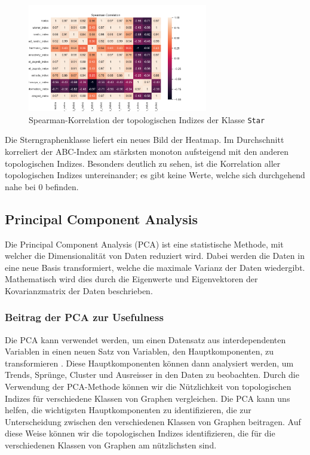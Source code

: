 \begin{figure}[H]
    \centering
    \includegraphics[width=0.7\textwidth]{images/30_results/star-correlation.png}
    \caption{Spearman-Korrelation der topologischen Indizes der Klasse \texttt{Star}}
    \label{fig:correlation-star}
\end{figure}

Die Sterngraphenklasse liefert ein neues Bild der Heatmap. Im Durchschnitt korreliert der ABC-Index am stärksten monoton aufsteigend mit den anderen topologischen Indizes. Besonders deutlich zu sehen, ist die Korrelation aller topologischen Indizes untereinander; es gibt keine Werte, welche sich durchgehend nahe bei $0$ befinden.

\newpage

\subsection{Principal Component Analysis}

Die Principal Component Analysis (PCA) ist eine statistische Methode, mit welcher die Dimensionalität von Daten reduziert \cite{jolliffe_principal_1986} wird.
Dabei werden die Daten in eine neue Basis transformiert, welche die maximale Varianz der Daten wiedergibt.
Mathematisch wird dies durch die Eigenwerte und Eigenvektoren der Kovarianzmatrix der Daten beschrieben.

\subsubsection{Beitrag der PCA zur Usefulness}

Die PCA kann verwendet werden, um einen Datensatz aus interdependenten Variablen in einen neuen Satz von Variablen, den Hauptkomponenten, zu transformieren \cite{jolliffe_principal_1986}.
Diese Hauptkomponenten können dann analysiert werden, um Trends, Sprünge, Cluster und Ausreisser in den Daten zu beobachten.
Durch die Verwendung der PCA-Methode können wir die Nützlichkeit von topologischen Indizes für verschiedene Klassen von Graphen vergleichen.
Die PCA kann uns helfen, die wichtigsten Hauptkomponenten zu identifizieren, die zur Unterscheidung zwischen den verschiedenen Klassen von Graphen beitragen.
Auf diese Weise können wir die topologischen Indizes identifizieren, die für die verschiedenen Klassen von Graphen am nützlichsten sind.

